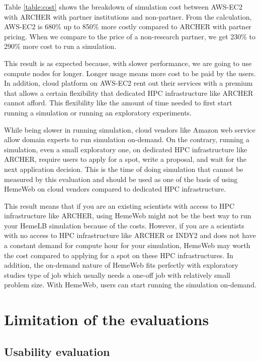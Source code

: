 Table \ref{table:cost} shows the breakdown of simulation cost between AWS-EC2 with ARCHER with partner institutions and non-partner. From the calculation, AWS-EC2 is 680\% up to 850\% more costly compared to ARCHER with partner pricing. When we compare to the price of a non-research partner, we get 230\% to 290\% more cost to run a simulation. 


This result is as expected because, with slower performance, we are going to use compute nodes for longer. Longer usage means more cost to be paid by the users. In addition, cloud platform on AWS-EC2 rent out their services with a premium that allows a certain flexibility that dedicated HPC infrastructure like ARCHER cannot afford. This flexibility like the amount of time needed to first start running a simulation or running an exploratory experiments.

While being slower in running simulation, cloud vendors like Amazon web service allow domain experts to run simulation on-demand. On the contrary,  running a simulation,  even a small exploratory one, on dedicated HPC infrastructure like ARCHER, require users to apply for a spot, write a proposal, and wait for the next application decision. This is the time of doing simulation that cannot be measured by this evaluation and should be used as one of the basis of using HemeWeb on cloud vendors compared to dedicated HPC infrastructure.

This result means that if you are an existing scientists with access to HPC infrastructure like ARCHER, using HemeWeb might not be the best way to run your HemeLB simulation because of the costs. However, if you are a scientists with no access to HPC infrastructure like ARCHER or INDY2 and does not have a constant demand for compute hour for your simulation, HemeWeb may worth the cost compared to applying for a spot on these HPC infrastructures. In addition, the on-demand nature of HemeWeb fits perfectly with exploratory studies type of job which usually needs a one-off job with relatively small problem size. With HemeWeb, users can start running the simulation on-demand.





\section {Limitation of the evaluations}

\subsection{Usability evaluation}

